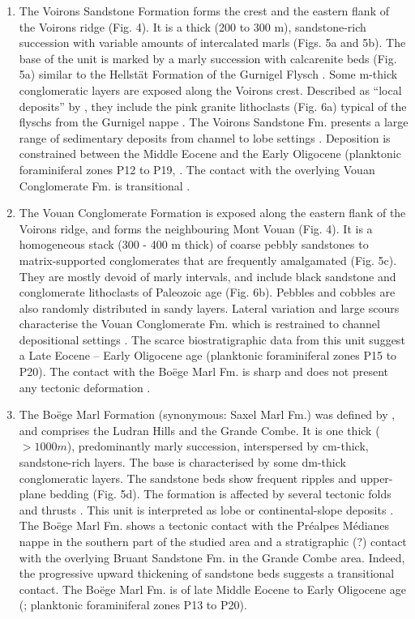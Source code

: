 \documentclass[twoside]{article}
\begin{document}
\begin{enumerate}
 \item The Voirons Sandstone Formation forms the crest and the eastern flank of the Voirons ridge (Fig. 4). It is a thick (200 to 300 m), sandstone-rich succession with variable amounts of intercalated marls (Figs. 5a and 5b). The base of the unit is marked by a marly succession with calcarenite beds (Fig. 5a) similar to the Hellstät Formation of the Gurnigel Flysch \citep{Tercier1928a,Caron1980,Caron1989}. Some m-thick conglomeratic layers are exposed along the Voirons crest. Described as “local deposits” by \cite{Lombard1940a}, they include the pink granite lithoclasts (Fig. 6a) typical of the flyschs from the Gurnigel nappe \citep{Caron1976}. The Voirons Sandstone Fm. presents a large range of sedimentary deposits from channel to lobe settings \citep{Ragusa2015}. Deposition is constrained between the Middle Eocene and the Early Oligocene (planktonic foraminiferal zones P12 to P19, \citealp{Ospina-Ostios2013}. The contact with the overlying Vouan Conglomerate Fm. is transitional \citep{Ragusa2015}.
 \item The Vouan Conglomerate Formation is exposed along the eastern flank of the Voirons ridge, and forms the neighbouring Mont Vouan (Fig. 4). It is a homogeneous stack (300 - 400 m thick) of coarse pebbly sandstones to matrix-supported conglomerates that are frequently amalgamated (Fig. 5c). They are mostly devoid of marly intervals, and include black sandstone and conglomerate lithoclasts of Paleozoic age (Fig. 6b). Pebbles and cobbles are also randomly distributed in sandy layers. Lateral variation and large scours \citep{Frebourg2006} characterise the Vouan Conglomerate Fm. which is restrained to channel depositional settings \citep{Ragusa2015}. The scarce biostratigraphic data from this unit \citep{Frebourg2006,Ospina-Ostios2013} suggest a Late Eocene – Early Oligocene age (planktonic foraminiferal zones P15 to P20). The contact with the Boëge Marl Fm. is sharp and does not present any tectonic deformation \citep{Ragusa2015}.
 \item The Boëge Marl Formation (synonymous: Saxel Marl Fm.) was defined by \cite{Stuijvenberg1980b}, and comprises the Ludran Hills and the Grande Combe. It is one thick ($>1000 m$), predominantly marly succession, interspersed by cm-thick, sandstone-rich layers. The base is characterised by some dm-thick conglomeratic layers. The sandstone beds show frequent ripples and upper-plane bedding (Fig. 5d). The formation is affected by several tectonic folds and thrusts \citep{Coppo1999,Ragusa2015}. This unit is interpreted as lobe or continental-slope deposits \citep{Winkler1984}. The Boëge Marl Fm. shows a tectonic contact with the Préalpes Médianes nappe in the southern part of the studied area and a stratigraphic (?) contact with the overlying Bruant Sandstone Fm. in the Grande Combe area. Indeed, the progressive upward thickening of sandstone beds suggests a transitional contact. The Boëge Marl Fm. is of late Middle Eocene to Early Oligocene age (\citealp{Ospina-Ostios2013}; planktonic foraminiferal zones P13 to P20).

\end{enumerate}
\end{document}
